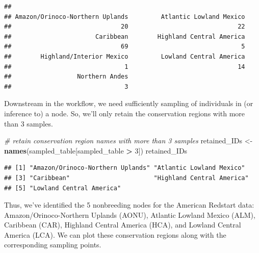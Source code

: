 \documentclass[
]{book}
\newenvironment{Shaded}{\begin{snugshade}}{\end{snugshade}}
\newcommand{\CommentTok}[1]{\textcolor[rgb]{0.56,0.35,0.01}{\textit{#1}}}
\newcommand{\DecValTok}[1]{\textcolor[rgb]{0.00,0.00,0.81}{#1}}
\newcommand{\FunctionTok}[1]{\textcolor[rgb]{0.13,0.29,0.53}{\textbf{#1}}}
\newcommand{\NormalTok}[1]{#1}
\newcommand{\OtherTok}[1]{\textcolor[rgb]{0.56,0.35,0.01}{#1}}
\newcommand{\SpecialCharTok}[1]{\textcolor[rgb]{0.81,0.36,0.00}{\textbf{#1}}}
\begin{document}
\begin{verbatim}
## 
## Amazon/Orinoco-Northern Uplands         Atlantic Lowland Mexico 
##                              20                              22 
##                       Caribbean        Highland Central America 
##                              69                               5 
##        Highland/Interior Mexico         Lowland Central America 
##                               1                              14 
##                  Northern Andes 
##                               3
\end{verbatim}

Downstream in the workflow, we need sufficiently sampling of individuals in (or inference to) a node. So, we'll only retain the conservation regions with more than 3 samples.

\begin{Shaded}
\begin{Highlighting}[]
\CommentTok{\# retain conservation region names with more than 3 samples}
\NormalTok{retained\_IDs }\OtherTok{\textless{}{-}} \FunctionTok{names}\NormalTok{(sampled\_table[sampled\_table }\SpecialCharTok{\textgreater{}} \DecValTok{3}\NormalTok{])}
\NormalTok{retained\_IDs}
\end{Highlighting}
\end{Shaded}

\begin{verbatim}
## [1] "Amazon/Orinoco-Northern Uplands" "Atlantic Lowland Mexico"        
## [3] "Caribbean"                       "Highland Central America"       
## [5] "Lowland Central America"
\end{verbatim}

Thus, we've identified the 5 nonbreeding nodes for the American Redstart data: Amazon/Orinoco-Northern Uplands (AONU), Atlantic Lowland Mexico (ALM), Caribbean (CAR), Highland Central America (HCA), and Lowland Central America (LCA). We can plot these conservation regions along with the corresponding sampling points.
\end{document}
